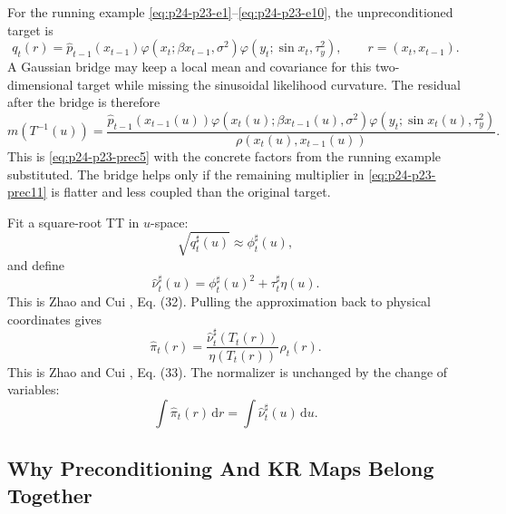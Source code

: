 \documentclass[11pt]{article}
\numberwithin{equation}{section}
\newcommand{\dd}{\,\mathrm d}
\begin{document}
For the running example \eqref{eq:p24-p23-e1}--\eqref{eq:p24-p23-e10}, the unpreconditioned target is
\begin{equation}
    q_t(r)
    =
    \widehat p_{t-1}(x_{t-1})
    \varphi(x_t;\beta x_{t-1},\sigma^2)
    \varphi(y_t;\sin x_t,\tau_y^2),
    \qquad
    r=(x_t,x_{t-1}).
    \label{eq:p24-p23-prec10}
\end{equation}
A Gaussian bridge may keep a local mean and covariance for this
two-dimensional target while missing the sinusoidal likelihood curvature.  The
residual after the bridge is therefore
\begin{equation}
    m(T^{-1}(u))
    =
    \frac{
    \widehat p_{t-1}(x_{t-1}(u))
    \varphi(x_t(u);\beta x_{t-1}(u),\sigma^2)
    \varphi(y_t;\sin x_t(u),\tau_y^2)}
    {\rho(x_t(u),x_{t-1}(u))}.
    \label{eq:p24-p23-prec11}
\end{equation}
This is \eqref{eq:p24-p23-prec5} with the concrete factors from the running example
substituted.  The bridge helps only if the remaining multiplier in
\eqref{eq:p24-p23-prec11} is flatter and less coupled than the original target.

Fit a square-root TT in \(u\)-space:
\[
    \sqrt{q^\sharp_t(u)}\approx \phi^\sharp_t(u),
\]
and define
\begin{equation}
    \widehat\nu^\sharp_t(u)
    =
    \phi^\sharp_t(u)^2+\tau^\sharp_t\eta(u).
    \label{eq:p24-p3}
\end{equation}
This is Zhao and Cui \cite{zhao2024ttsequential}, Eq. (32).  Pulling the approximation back to physical
coordinates gives
\begin{equation}
    \widehat\pi_t(r)
    =
    \frac{\widehat\nu^\sharp_t(T_t(r))}
    {\eta(T_t(r))}
    \rho_t(r).
    \label{eq:p24-p4}
\end{equation}
This is Zhao and Cui \cite{zhao2024ttsequential}, Eq. (33).  The normalizer is unchanged by the change of
variables:
\begin{equation}
    \int \widehat\pi_t(r)\dd r
    =
    \int \widehat\nu^\sharp_t(u)\dd u.
    \label{eq:p24-p5}
\end{equation}

\subsection*{Why Preconditioning And KR Maps Belong Together}
\end{document}
